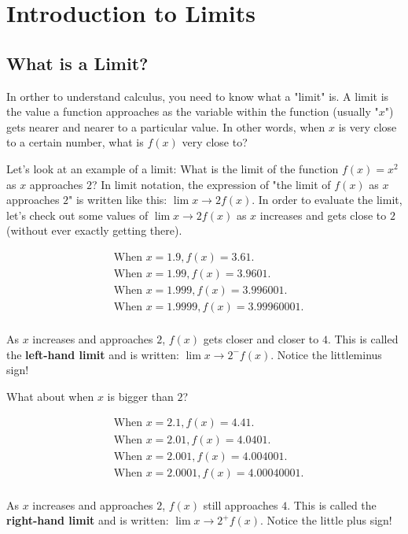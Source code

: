 \chapter{Introduction to Limits}

\section{What is a Limit?}

In orther to understand calculus, you need to know what a "limit" is. A limit is the value a function approaches as the variable within the function (usually "$x$") gets nearer and nearer to a particular value. In other words, when $x$ is very close to a certain number, what is $f(x)$ very close to?

Let's look at an example of a limit: What is the limit of the function $f(x)=x^2$ as $x$ approaches $2$? In limit notation, the expression of "the limit of $f(x)$ as $x$ approaches $2$" is written like this: $\lim\limits{x\to 2}f(x)$. In order to evaluate the limit, let's check out some values of $\lim\limits{x\to 2}f(x)$ as $x$ increases and gets close to $2$ (without ever exactly getting there).

\begin{align*}
    & \text{When }x=1.9, f(x) = 3.61.\\
    & \text{When }x=1.99, f(x) = 3.9601.\\
    & \text{When }x=1.999, f(x) = 3.996001.\\
    & \text{When }x=1.9999, f(x) = 3.99960001.\\
\end{align*}

As $x$ increases and approaches $2$, $f(x)$ gets closer and closer to $4$. This is called the \textbf{left-hand limit} and is written: $\lim\limits{x\to 2^-}f(x)$. Notice the littleminus sign!

What about when $x$ is bigger than $2$?

\begin{align*}
    & \text{When }x=2.1, f(x) = 4.41.\\
    & \text{When }x=2.01, f(x) = 4.0401.\\
    & \text{When }x=2.001, f(x) = 4.004001.\\
    & \text{When }x=2.0001, f(x) = 4.00040001.\\
\end{align*}

As $x$ increases and approaches $2$, $f(x)$ still approaches $4$. This is called the \textbf{right-hand limit} and is written: $\lim\limits{x\to 2^+}f(x)$. Notice the little plus sign!

